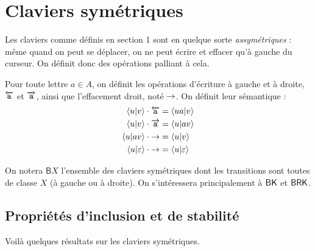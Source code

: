 \documentclass[12pt, a4paper]{article}
\begin{document}
    \section{Claviers symétriques}
    Les claviers comme définis en section 1 sont en quelque sorte \emph{assymétriques} : même quand on peut se déplacer, on ne peut écrire et effacer qu'à gauche du curseur.
    On définit donc des opérations palliant à cela.
    \begin{defopsym}
        Pour toute lettre $a \in A$, on définit les opérations d'écriture à gauche et à droite, $\overleftarrow{\mathtt{a}}$ et $\overrightarrow{\mathtt{a}}$, ainsi que l'effacement droit, noté $\mathord{\rightarrow}$.
        On définit leur sémantique :
        \begin{align*}
            \left\langle u \middle| v \right\rangle \cdot \overleftarrow{\mathtt{a}} &= \left\langle ua \middle| v \right\rangle   \\
            \left\langle u \middle| v \right\rangle \cdot \overrightarrow{\mathtt{a}} &= \left\langle u \middle| av \right\rangle   \\
            \left\langle u \middle| av \right\rangle \cdot \mathord{\rightarrow} &= \left\langle u \middle| v \right\rangle        \\
            \left\langle u \middle| \varepsilon \right\rangle \cdot \mathord{\rightarrow} &= \left\langle u \middle| \varepsilon \right\rangle
        \end{align*}
    \end{defopsym}
    On notera $\mathsf{B}X$ l'ensemble des claviers symétriques dont les transitions sont toutes de classe $X$ (à gauche ou à droite). On s'intéressera principalement à $\mathsf{BK}$ et $\mathsf{BRK}$.
    \subsection{Propriétés d'inclusion et de stabilité}
    Voilà quelques résultats sur les claviers symétriques.
\end{document}
